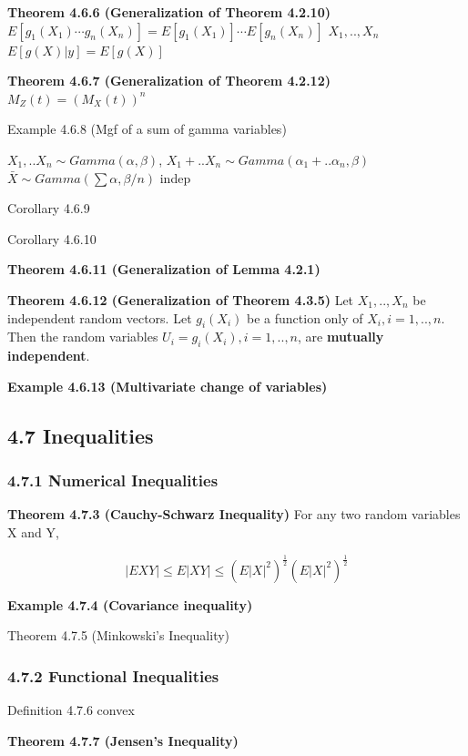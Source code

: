 \documentclass[6pt,twocolumn,Portrait]{article}
\begin{document}
\textbf{Theorem 4.6.6 (Generalization of Theorem 4.2.10)}
\(E[g_1(X_1)\cdots g_n(X_n)]=E[g_1(X_1)]\cdots E[g_n(X_n)]\)
\(X_1,.., X_n\) \(E[g(X)|y]=E[g(X)]\)

\textbf{Theorem 4.6.7 (Generalization of Theorem 4.2.12)}
\(M_Z(t)=(M_X(t))^n\)

Example 4.6.8 (Mgf of a sum of gamma variables)

\(X_1,..X_n\sim Gamma(\alpha,\beta)\),
\(X_1+..X_n\sim Gamma(\alpha_1+..\alpha_n,\beta)\)
\(\bar X\sim Gamma(\sum\alpha,\beta/n)\) indep

Corollary 4.6.9

Corollary 4.6.10

\textbf{Theorem 4.6.11 (Generalization of Lemma 4.2.1)}

\textbf{Theorem 4.6.12 (Generalization of Theorem 4.3.5)} Let
\(X_1,.., X_n\) be independent random vectors. Let \(g_i(X_i)\) be a
function only of \(X_i,i=1,..,n\). Then the random variables
\(U_i=g_i(X_i),i=1,..,n\), are \textbf{mutually independent}.

\textbf{Example 4.6.13 (Multivariate change of variables)}

\hypertarget{inequalities}{%
\subsection{4.7 Inequalities}\label{inequalities}}

\hypertarget{numerical-inequalities}{%
\subsubsection{4.7.1 Numerical
Inequalities}\label{numerical-inequalities}}

\textbf{Theorem 4.7.3 (Cauchy-Schwarz Inequality)} For any two random
variables X and Y,

\[|EXY|\le E|XY|\le(E|X|^2)^{\frac12}(E|X|^2)^{\frac12}\]

\textbf{Example 4.7.4 (Covariance inequality)}

Theorem 4.7.5 (Minkowski's Inequality)

\hypertarget{functional-inequalities}{%
\subsubsection{4.7.2 Functional
Inequalities}\label{functional-inequalities}}

Definition 4.7.6 convex

\textbf{Theorem 4.7.7 (Jensen's Inequality)}
\end{document}
